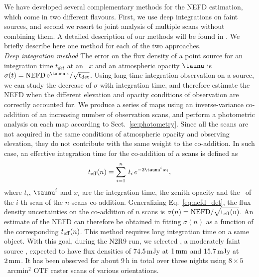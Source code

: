 We have developed several complementary methods for the
NEFD estimation, which come in two different flavours. First, we
use deep integrations on faint sources, and second we resort to 
joint analysis of multiple scans without combining them. A detailed
description of our methods will be found in \citet{Ponthieu2019}.
We briefly describe here one method for each of the two approaches. \\

\noindent \emph{Deep integration method} The error on the flux density of a
point source for an integration time $t_{det}$ at an \airmass\ $x$
and an atmospheric opacity $\taunu$ is
$\sigma(t) = \rm{NEFD}\,e^{\taunu \, x}/\sqrt{t_{\rm{det}}}$.
Using long-time integration observation on a source, we can study the
decrease of $\sigma$ with integration time, and
therefore estimate the NEFD when the different elevation and opacity conditions of
observation are correctly accounted for.  We produce a series of maps using an
inverse-variance co-addition of an increasing number of observation
scans, and perform a photometric analysis on each map according to
Sect.~\ref{se:photometry}. Since
all the scans are not acquired in the same conditions of atmospheric
opacity and observing elevation, they do not contribute with the same
weight to the co-addition. In such case, an effective integration time
for the co-addition of $n$ scans is defined as
%
\begin{equation}
t_{\rm{eff}}(n) = \sum_{i=1}^{n}\, t_i\,  e^{-2\taunu^i\, x_i},
\label{eq:sigma_tau_w8}
\end{equation}
%
where $t_i$, $\taunu^i$ and $x_i$ are the integration time, the zenith
opacity and the \airmass\ of the $i$-th scan of the $n$-scans
co-addition. Generalizing Eq.~\ref{eq:nefd_det},
the flux density uncertainties on the co-addition of $n$ scans is
$\sigma(n) = \rm{NEFD}/\sqrt{t_{\rm{eff}}(n)}$. An estimate of the
NEFD can therefore be obtained in fitting
$\sigma(n)$ as a function of the corresponding $t_{\rm{eff}}(n)$. This
method requires long integration time
on a same object. With this goal, during the N2R9 run, we selected \hls, a
moderately faint source
\citep{2012A&A...538L...4C}, expected to have flux densities of 74.5\,mJy at $1\,\rm{mm}$
and 15.7\,mJy at $2\, \rm{mm}$. %
It has been observed for about 9\,h in
total over three nights using $8 \times 5$~arcmin$^2$ OTF raster scans of various
orientations.\\

